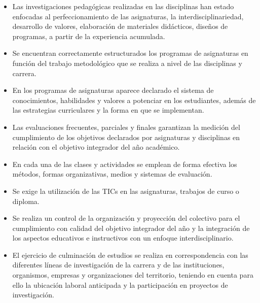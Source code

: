 \begin{itemize}
	\item Las investigaciones pedagógicas realizadas en las disciplinas han estado enfocadas al perfeccionamiento de las asignaturas, la interdisciplinariedad, desarrollo de valores, elaboración de materiales didácticos, diseños de programas, a partir de la experiencia acumulada.
	\item Se encuentran correctamente estructurados los programas de asignaturas en función del trabajo metodológico que se realiza a nivel de las disciplinas y carrera.
	\item En los programas de asignaturas aparece declarado el sistema de conocimientos, habilidades y valores a potenciar en los estudiantes, además de las estrategias curriculares y la forma en que se implementan.
	\item Las evaluaciones frecuentes, parciales y finales garantizan la medición del cumplimiento de los objetivos declarados por asignaturas y disciplinas en relación con el objetivo integrador del año académico.
	\item En cada una de las clases y actividades se emplean de forma efectiva los métodos, formas organizativas, medios y sistemas de evaluación.
	\item Se exige la utilización de las TICs en las asignaturas, trabajos de curso o diploma.
	\item Se realiza un control de la organización y proyección del colectivo para el cumplimiento con calidad del objetivo integrador del año y la integración de los aspectos educativos e instructivos con un enfoque interdisciplinario.
	\item El ejercicio de culminación de estudios se realiza en correspondencia con las diferentes líneas de investigación de la carrera y de las instituciones, organismos, empresas y organizaciones del territorio, teniendo en cuenta para ello la ubicación laboral anticipada y la participación en proyectos de investigación.
\end{itemize}